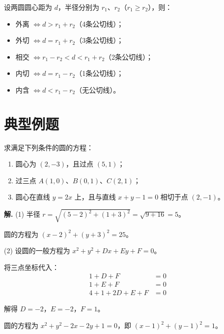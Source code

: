 \documentclass[11pt]{ctexrep}
\begin{document}
\begin{property}[圆与圆的位置关系]
    设两圆圆心距为 $d$，半径分别为 $r_1$、$r_2$（$r_1 \geq r_2$），则：
    \begin{itemize}
        \item 外离 $\Leftrightarrow d > r_1 + r_2$（4条公切线）；
        \item 外切 $\Leftrightarrow d = r_1 + r_2$（3条公切线）；
        \item 相交 $\Leftrightarrow r_1 - r_2 < d < r_1 + r_2$（2条公切线）；
        \item 内切 $\Leftrightarrow d = r_1 - r_2$（1条公切线）；
        \item 内含 $\Leftrightarrow d < r_1 - r_2$（无公切线）。
    \end{itemize}
\end{property}

\section*{典型例题}

\begin{example}[求圆的方程]
    求满足下列条件的圆的方程：
    \begin{enumerate}
        \item 圆心为 $(2, -3)$，且过点 $(5, 1)$；
        \item 过三点 $A(1, 0)$、$B(0, 1)$、$C(2, 1)$；
        \item 圆心在直线 $y = 2x$ 上，且与直线 $x + y - 1 = 0$ 相切于点 $(2, -1)$。
    \end{enumerate}
\end{example}

\textbf{解.} (1) 半径 $r = \sqrt{(5 - 2)^2 + (1 + 3)^2} = \sqrt{9 + 16} = 5$。

圆的方程为 $\boxed{(x - 2)^2 + (y + 3)^2 = 25}$。

(2) 设圆的一般方程为 $x^2 + y^2 + Dx + Ey + F = 0$。

将三点坐标代入：
\begin{align*}
    1 + D + F &= 0 \\
    1 + E + F &= 0 \\
    4 + 1 + 2D + E + F &= 0
\end{align*}

解得 $D = -2$，$E = -2$，$F = 1$。

圆的方程为 $\boxed{x^2 + y^2 - 2x - 2y + 1 = 0}$，即 $(x - 1)^2 + (y - 1)^2 = 1$。
\end{document}
